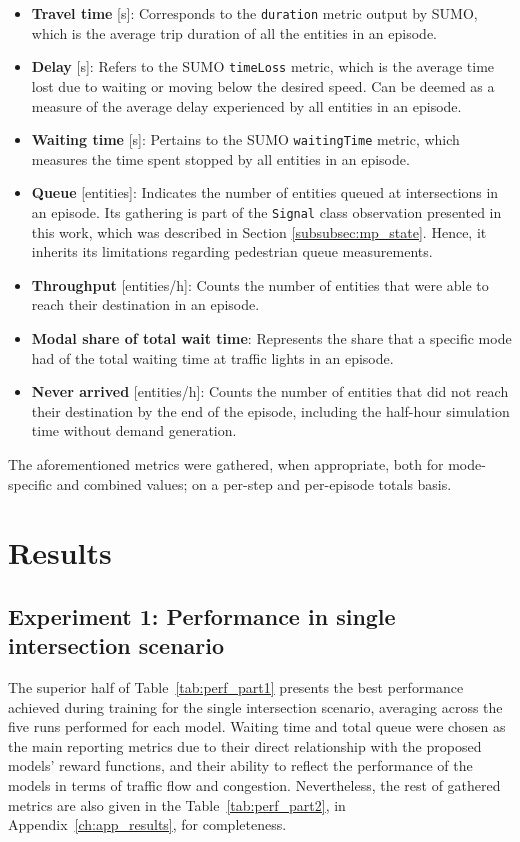 \begin{itemize}
  \item \textbf{Travel time} [s]: Corresponds to the \texttt{duration} metric output by SUMO, which is the average trip duration of all the entities in an episode. 
  \item \textbf{Delay} [s]: Refers to the SUMO \texttt{timeLoss} metric, which is the average time lost due to waiting or moving below the desired speed. Can be deemed as a measure of the average delay experienced by all entities in an episode.
  \item \textbf{Waiting time} [s]: Pertains to the SUMO \texttt{waitingTime} metric, which measures the time spent stopped by all entities in an episode.
  \item \textbf{Queue} [entities]: Indicates the number of entities queued at intersections in an episode. Its gathering is part of the \texttt{Signal} class observation presented in this work, which was described in Section \ref{subsubsec:mp_state}. Hence, it inherits its limitations regarding pedestrian queue measurements.
  \item \textbf{Throughput} [entities/h]: Counts the number of entities that were able to reach their destination in an episode.
  \item \textbf{Modal share of total wait time}: Represents the share that a specific mode had of the total waiting time at traffic lights in an episode. 
  \item \textbf{Never arrived} [entities/h]: Counts the number of entities that did not reach their destination by the end of the episode, including the half-hour simulation time without demand generation.
\end{itemize}

The aforementioned metrics were gathered, when appropriate, both for mode-specific and combined values; on a per-step and per-episode totals basis.

\section{Results}

\subsection{Experiment 1: Performance in single intersection scenario} \label{subsec:perf_part1}
The superior half of Table~\ref{tab:perf_part1} presents the best performance achieved during training for the single intersection scenario, averaging across the five runs performed for each model. Waiting time and total queue were chosen as the main reporting metrics due to their direct relationship with the proposed models' reward functions, and their ability to reflect the performance of the models in terms of traffic flow and congestion. Nevertheless, the rest of gathered metrics are also given in the Table~\ref{tab:perf_part2}, in Appendix~\ref{ch:app_results}, for completeness.

